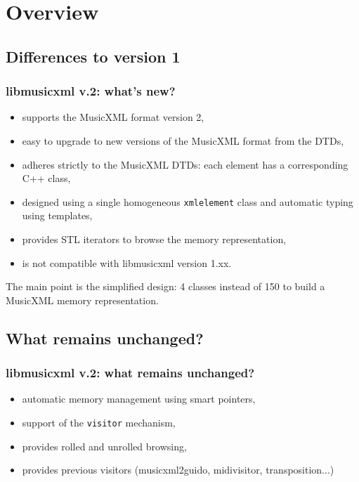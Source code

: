 \documentclass{beamer}
\begin{document}
\section{Overview}
\subsection{Differences to version 1}
\begin{frame}
	\frametitle{libmusicxml v.2: what's new?}
	\begin{itemize}
		\item supports the MusicXML format version 2,
		\item easy to upgrade to new versions of the MusicXML format from the DTDs,
		\item adheres strictly to the MusicXML DTDs: each element has a corresponding C++ class,
		\item designed using a single homogeneous \texttt{xmlelement} class and automatic 
		typing using templates,
		\item provides STL iterators to browse the memory representation,
		\item is \alert{not compatible} with libmusicxml version 1.xx.
	\end{itemize}
	\begin{block}{}
	The main point is the simplified design: 4 classes instead of 150 to build a MusicXML 
	memory representation. 
	\end{block}
\end{frame}

\subsection{What remains unchanged?}
\begin{frame}
	\frametitle{libmusicxml v.2: what remains unchanged?}
	\begin{itemize}
		\item automatic memory management using smart pointers,
		\item support of the \texttt{visitor} mechanism,
		\item provides rolled and unrolled browsing,
		\item provides previous visitors (musicxml2guido, midivisitor, transposition...) 
	\end{itemize}
\end{frame}
\end{document}
